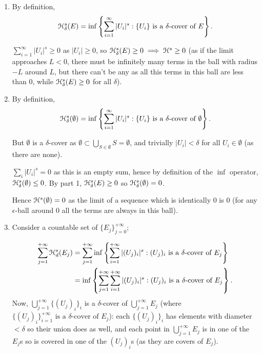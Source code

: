
\begin{enumerate}
    \item By definition,
    \[\mathcal{H}^s_\delta(E) = \inf \left\{\sum_{i=1}^\infty |U_i|^s : \{U_i\}\text{ is a }\delta\text{-cover of }E\right\}.\]

    \(\sum_{i=1}^\infty |U_i|^s \geq 0\) as \(|U_i| \geq 0\), so \(\mathcal{H}^s_\delta(E) \geq 0 \implies \mathcal{H}^s \geq 0\) (as if the limit approaches \(L < 0\), there must be infinitely many terms in the ball with radius \(-L\) around \(L\), but there can't be any as all this terms in this ball are less than 0, while  \(\mathcal{H}_\delta^s(E) \geq 0\) for all \(\delta\)).

\item By definition,
    \[\mathcal{H}^s_\delta(\emptyset) = \inf \left\{ \sum_{i=1}^\infty |U_i|^s : \{U_i\} \text{ is a }\delta\text{-cover of }\emptyset\right\}.\]
    
    But \(\emptyset\) is a \(\delta\)-cover as \(\emptyset \subset \bigcup_{S \in \emptyset} S = \emptyset\), and trivially \(|U_i| < \delta\) for all \(U_i \in \emptyset\) (as there are none).

    \(\sum_i |U_i|^s = 0\) as this is an empty sum, hence by definition of the \(\inf\) operator, \(\mathcal{H}_\delta^s (\emptyset) \leq 0\). By part 1, \(\mathcal{H}^s_\delta(E) \geq 0\) so \(\mathcal{H}_\delta^s (\emptyset) = 0\).
    
    Hence \(\mathcal{H}^s (\emptyset) = 0\) as the limit of a sequence which is identically 0 is 0 (for any \(\epsilon\)-ball around \(0\) all the terms are always in this ball).

\item  Consider a countable set of $\{E_j\}_{j = 0}^{+\infty}$;

    \begin{align*}
    \sum_{j = 1}^{+\infty} \mathcal{H}_d^s(E_j) &= \sum_{j = 1}^{+\infty} \inf \left\{ \sum_{i = 1}^{+\infty} |(U_j)_i|^s : (U_j)_i \text{ is a }\delta\text{-cover of } E_j \right\} \\
    &= \inf \left\{ \sum_{j = 1}^{+\infty} \sum_{i = 1}^{+\infty} |(U_j)_i|^s : (U_j)_i \text{ is a }\delta\text{-cover of } E_j \right\}. 
    \end{align*}
    Now, \(\bigcup_{j = 1}^{+\infty} \{(U_j)_i\}_i\) is a \(\delta\)-cover of \(\bigcup_{j = 1}^{+\infty} E_j\) (where \(\{(U_j)_i\}_{i = 1}^{+\infty} \text{ is a }\delta\text{-cover of } E_j\)): each \(\{(U_j)_i\}_i\) has elements with diameter \(< \delta\) so their union does as well, and each point in \(\bigcup_{j = 1}^{+\infty} E_j\) is in one of the \(E_j\)s so is covered in one of the \((U_j)_i\)s (as they are covers of \(E_j\)). 
    

\end{enumerate}
